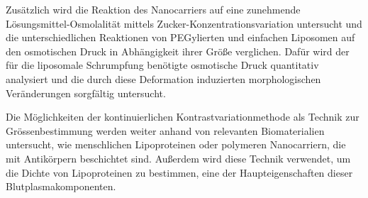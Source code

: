

Zusätzlich wird die Reaktion des Nanocarriers auf eine zunehmende Lösungsmittel-Osmolalität mittels Zucker-Konzentrationsvariation untersucht und die unterschiedlichen Reaktionen von PEGylierten und einfachen Liposomen auf den osmotischen Druck in Abhängigkeit ihrer Größe verglichen. Dafür wird der für die liposomale Schrumpfung benötigte osmotische Druck quantitativ analysiert und die durch diese Deformation induzierten morphologischen Veränderungen sorgfältig untersucht.




Die Möglichkeiten der kontinuierlichen Kontrastvariationmethode als Technik zur Grössenbestimmung werden weiter anhand von relevanten Biomaterialien untersucht, wie menschlichen Lipoproteinen oder polymeren Nanocarriern, die mit Antikörpern beschichtet sind. Außerdem wird diese Technik verwendet, um die Dichte von Lipoproteinen zu bestimmen, eine der Haupteigenschaften dieser Blutplasmakomponenten.








\normalsize

\cleardoublepage
